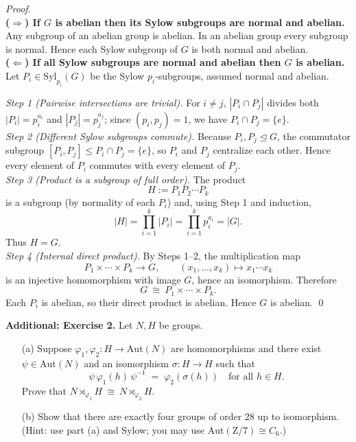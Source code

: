 \documentclass[11pt]{article}
\theoremstyle{definition}
\newcommand{\Aut}{\mathrm{Aut}}
\newcommand{\Syl}{\mathrm{Syl}}
\newcommand{\Z}{\mathrm{Z}}
\begin{document}
\dotfill

\emph{Proof.}\\
\textbf{($\Rightarrow$) If $G$ is abelian then its Sylow subgroups are normal and abelian.} Any subgroup of an abelian group is abelian. In an abelian group every subgroup is normal. Hence each Sylow subgroup of $G$ is both normal and abelian.\\

\textbf{($\Leftarrow$) If all Sylow subgroups are normal and abelian then $G$ is abelian.}
Let $P_i\in\Syl_{p_i}(G)$ be the Sylow $p_i$-subgroups, assumed normal and abelian.

\smallskip
\textit{Step 1 (Pairwise intersections are trivial).} For $i\neq j$, $|P_i\cap P_j|$ divides both $|P_i|=p_i^{a_i}$ and $|P_j|=p_j^{a_j}$; since $(p_i,p_j)=1$, we have $P_i\cap P_j=\{e\}$.\\

\textit{Step 2 (Different Sylow subgroups commute).} Because $P_i,P_j\trianglelefteq G$, the commutator subgroup $[P_i,P_j]\le P_i\cap P_j=\{e\}$, so $P_i$ and $P_j$ centralize each other. Hence every element of $P_i$ commutes with every element of $P_j$.\\

\textit{Step 3 (Product is a subgroup of full order).} The product
\[
H:=P_1P_2\cdots P_k
\]
is a subgroup (by normality of each $P_i$) and, using Step 1 and induction,
\[
|H|=\prod_{i=1}^k |P_i|=\prod_{i=1}^k p_i^{a_i}=|G|.
\]
Thus $H=G$.\\

\textit{Step 4 (Internal direct product).} By Steps 1–2, the multiplication map
\[
P_1\times\cdots\times P_k \longrightarrow G,\qquad (x_1,\ldots,x_k)\mapsto x_1\cdots x_k
\]
is an injective homomorphism with image $G$, hence an isomorphism. Therefore
\[
G\ \cong\ P_1\times\cdots\times P_k.
\]
Each $P_i$ is abelian, so their direct product is abelian. Hence $G$ is abelian. \qed

\newpage

\newpage

\noindent \textbf{Additional: Exercise 2.} 
Let $N,H$ be groups.
\begin{itemize}
  \item[(a)] Suppose $\varphi_1,\varphi_2: H\to \Aut(N)$ are homomorphisms and there exist $\psi\in\Aut(N)$ and an isomorphism $\sigma:H\to H$ such that
  \[
  \psi\,\varphi_1(h)\,\psi^{-1}\;=\;\varphi_2(\sigma(h))\quad\text{for all }h\in H.
  \]
  Prove that $N\rtimes_{\varphi_1} H\ \cong\ N\rtimes_{\varphi_2} H$.
  \item[(b)] Show that there are exactly four groups of order $28$ up to isomorphism. (Hint: use part (a) and Sylow; you may use $\Aut(\Z/7)\cong C_6$.)
\end{itemize}
\end{document}
